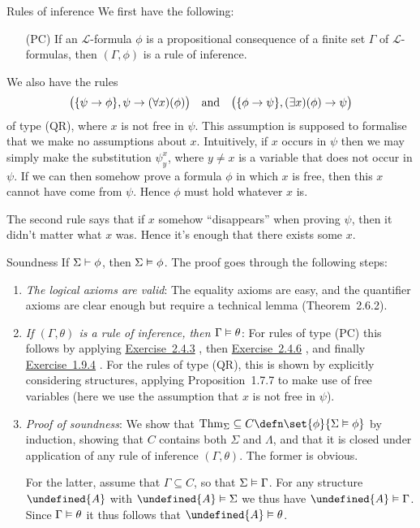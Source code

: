 \documentclass[article, a4paper, 11pt, oneside]{memoir}
\let\mathfrak\undefined
\numberwithin{equation}{chapter}
\newcommand{\calL}{\mathcal{L}}
\newcommand{\frakA}{\mathfrak{A}}
\newcommand{\RNum}[1]{\uppercase\expandafter{\romannumeral #1\relax}}
\newcommand{\exref}[1]{%
    \hyperref[ex:#1]{Exercise~#1}%
}
\theoremstyle{nonumberplain}
\begin{document}
\begin{notelist}
    \item[Rules of inference]
    We first have the following:
    \begin{enumerate}
        \item[(PC)] If an $\calL$-formula $\phi$ is a propositional consequence of a finite set $\Gamma$ of $\calL$-formulas, then $(\Gamma,\phi)$ is a rule of inference.
    \end{enumerate}
    
    We also have the rules
    \begin{equation*}
        \bigl( \{ \psi \rightarrow \phi \}, \psi \rightarrow (\forall x)(\phi) \bigr)
        \quad \text{and} \quad
        \bigl( \{ \phi \rightarrow \psi \}, (\exists x)(\phi) \rightarrow \psi \bigr)
    \end{equation*}
    of type (QR), where $x$ is not free in $\psi$. This assumption is supposed to formalise that we make no assumptions about $x$. Intuitively, if $x$ occurs in $\psi$ then we may simply make the substitution $\psi^x_y$, where $y \neq x$ is a variable that does not occur in $\psi$. If we can then somehow prove a formula $\phi$ in which $x$ is free, then this $x$ cannot have come from $\psi$. Hence $\phi$ must hold whatever $x$ is.
    
    The second rule says that if $x$ somehow \enquote{disappears} when proving $\psi$, then it didn't matter what $x$ was. Hence it's enough that there exists some $x$.

    \item[Soundness]
    If $\Sigma \vdash \phi$, then $\Sigma \vDash \phi$. The proof goes through the following steps:
    \begin{enumerate}
        \item \emph{The logical axioms are valid}: The equality axioms are easy, and the quantifier axioms are clear enough but require a technical lemma (Theorem~2.6.2).
        
        \item \emph{If $(\Gamma,\theta)$ is a rule of inference, then $\Gamma \vDash \theta$}: For rules of type (PC) this follows by applying \exref{2.4.3}, then \exref{2.4.6}, and finally \exref{1.9.4}. For the rules of type (QR), this is shown by explicitly considering structures, applying Proposition~1.7.7 to make use of free variables (here we use the assumption that $x$ is not free in $\psi$).
        
        \item \emph{Proof of soundness}: We show that $\thm{\Sigma} \subseteq C \defn \set{\phi}{\Sigma \limplies \phi}$ by induction, showing that $C$ contains both $\Sigma$ and $\Lambda$, and that it is closed under application of any rule of inference $(\Gamma,\theta)$. The former is obvious.
        
        For the latter, assume that $\Gamma \subseteq C$, so that $\Sigma \vDash \Gamma$. For any structure $\frakA$ with $\frakA \models \Sigma$ we thus have $\frakA \models \Gamma$. Since $\Gamma \vDash \theta$ it thus follows that $\frakA \models \theta$.
    \end{enumerate}
\end{notelist}
\end{document}
